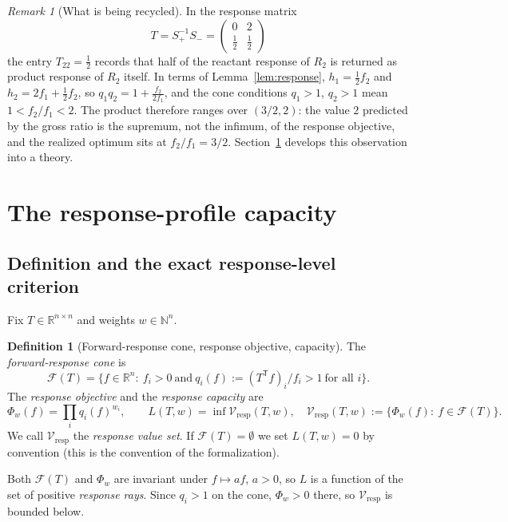 \documentclass[11pt,reqno]{amsart}
\theoremstyle{plain}
\theoremstyle{definition}
\newtheorem{definition}[theorem]{Definition}
\theoremstyle{remark}
\newtheorem{remark}[theorem]{Remark}
\numberwithin{equation}{section}
\newcommand{\R}{\mathbb{R}}
\newcommand{\N}{\mathbb{N}}
\newcommand{\Sp}{S_{+}}
\newcommand{\Sm}{S_{-}}
\newcommand{\T}{\mathsf{T}}
\newcommand{\cone}{\mathcal{F}}
\newcommand{\Vresp}{\mathcal{V}_{\mathrm{resp}}}
\begin{document}
\begin{remark}[What is being recycled]
In the response matrix
\[
T=\Sp^{-1}\Sm=\begin{pmatrix}0&2\\ \tfrac12&\tfrac12\end{pmatrix}
\]
the entry $T_{22}=\tfrac12$ records that half of the reactant response of $R_2$ is returned as product response of $R_2$ itself.  In terms of Lemma~\ref{lem:response}, $h_1=\tfrac12f_2$ and $h_2=2f_1+\tfrac12f_2$, so $q_1q_2=1+\tfrac{f_2}{2f_1}$, and the cone conditions $q_1>1$, $q_2>1$ mean $1<f_2/f_1<2$.  The product therefore ranges over $(3/2,2)$: the value $2$ predicted by the gross ratio is the supremum, not the infimum, of the response objective, and the realized optimum sits at $f_2/f_1=3/2$.  Section~\ref{sec:capacity} develops this observation into a theory.
\end{remark}

\section{The response-profile capacity}\label{sec:capacity}

\subsection{Definition and the exact response-level criterion}
Fix $T\in\R^{n\times n}$ and weights $w\in\N^n$.

\begin{definition}[Forward-response cone, response objective, capacity]\label{def:capacity}
The \emph{forward-response cone} is
\[
\cone(T)=\{f\in\R^n:\ f_i>0\ \text{and}\ q_i(f):=(T^{\T}f)_i/f_i>1\ \text{for all }i\}.
\]
The \emph{response objective} and the \emph{response capacity} are
\[
\Phi_w(f)=\prod_i q_i(f)^{w_i},\qquad L(T,w)=\inf\Vresp(T,w),\quad\Vresp(T,w):=\{\Phi_w(f):\ f\in\cone(T)\}.
\]
We call $\Vresp$ the \emph{response value set}.  If $\cone(T)=\emptyset$ we set $L(T,w)=0$ by convention (this is the convention of the formalization).
\end{definition}

Both $\cone(T)$ and $\Phi_w$ are invariant under $f\mapsto af$, $a>0$, so $L$ is a function of the set of positive \emph{response rays}.  Since $q_i>1$ on the cone, $\Phi_w>0$ there, so $\Vresp$ is bounded below.
\end{document}
